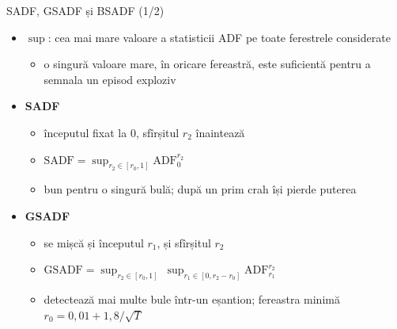 \begin{frame}{SADF, GSADF și BSADF (1/2)}
\itemsize{\small}
\begin{itemize}
    \item $\sup$: cea mai mare valoare a statisticii ADF pe toate ferestrele considerate
    \begin{itemize}
        \item o singură valoare mare, în oricare fereastră, este suficientă pentru a semnala un episod exploziv
    \end{itemize}
    \item \textbf{SADF} 
    \begin{itemize}
        \item începutul fixat la 0, sfîrșitul $r_2$ înaintează
        \item $\mathrm{SADF} = \sup_{r_2 \in [r_0, 1]} \mathrm{ADF}_{0}^{r_2}$
        \item bun pentru o singură bulă; după un prim crah își pierde puterea
    \end{itemize}
    \item \textbf{GSADF} 
    \begin{itemize}
        \item se mișcă și începutul $r_1$, și sfîrșitul $r_2$
        \item $\mathrm{GSADF} = \sup_{r_2 \in [r_0,1]}\ \sup_{r_1 \in [0, r_2 - r_0]} \mathrm{ADF}_{r_1}^{r_2}$
        \item detectează mai multe bule într-un eșantion; fereastra minimă $r_0 = 0{,}01 + 1{,}8/\sqrt{T}$
    \end{itemize}
\end{itemize}
\end{frame}

